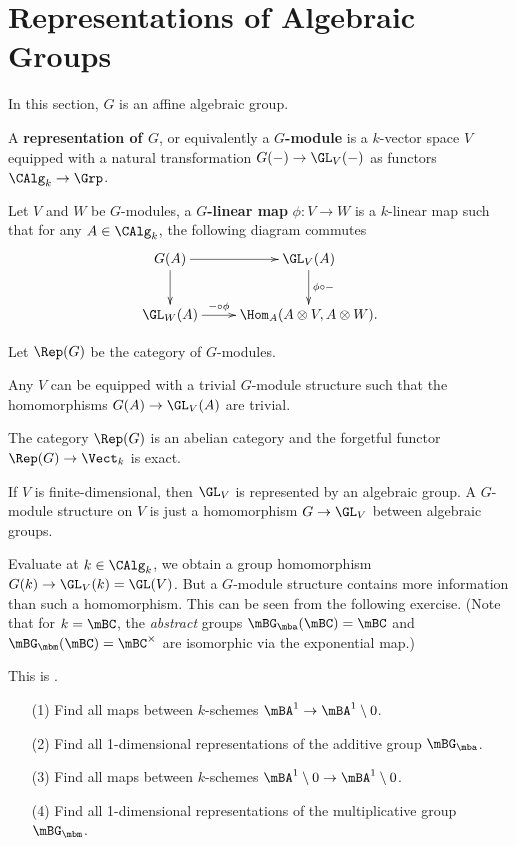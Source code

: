 \section{Representations of Algebraic Groups}

In this section, $G$ is an affine algebraic group.

\begin{defn}
	A \textbf{representation of $G$}, or equivalently a \textbf{$G$-module} is a $k$-vector space $V$ equipped with a natural transformation $G(-)\to \GL_V(-)$ as functors $\CAlg_k \to \Grp$.

	Let $V$ and $W$ be $G$-modules, a \textbf{$G$-linear map} $\phi:V\to W$ is a $k$-linear map such that for any $A\in \CAlg_k$, the following diagram commutes
	\[
		\xymatrix{
			G(A) \ar[r] \ar[d] &
			\GL_V(A) \ar[d]^-{\phi\circ-} \\
			\GL_W(A) \ar[r]^-{-\circ \phi} &
			\Hom_A( A\ot V,A\ot W ).
		}
	\]

	Let $\Rep(G)$ be the category of $G$-modules.
\end{defn}

\begin{exam}
	Any $V$ can be equipped with a trivial $G$-module structure such that the homomorphisms $G(A) \to \GL_V(A)$ are trivial.
\end{exam}

\begin{prop}
	The category $\Rep(G)$ is an abelian category and the forgetful functor $\Rep(G)\to \Vect_k$ is exact. 
\end{prop}

\begin{rem}
	If $V$ is finite-dimensional, then $\GL_V$ is represented by an algebraic group. A $G$-module structure on $V$ is just a homomorphism $G\to \GL_V$ between algebraic groups.
\end{rem}

\begin{warn}
	Evaluate at $k\in \CAlg_k$, we obtain a group homomorphism $G(k) \to \GL_V(k)=\GL(V)$. But a $G$-module structure contains more information than such a homomorphism. This can be seen from the following exercise. (Note that for $k=\mBC$, the \emph{abstract} groups $\mBG_\mba(\mBC)=\mBC$ and $\mBG_\mbm(\mBC)=\mBC^\times$ are isomorphic via the exponential map.)
\end{warn}


\begin{exe}
	This is .
	\begin{itemize}
		\item[(1)]
			Find all maps between $k$-schemes $\mBA^1\to \mBA^1\setminus 0$.
		\item[(2)]
			Find all 1-dimensional representations of the additive group $\mBG_\mba$.
		\item[(3)]
			Find all maps between $k$-schemes $\mBA^1\setminus 0\to \mBA^1\setminus 0$.
		\item[(4)]
			Find all 1-dimensional representations of the multiplicative group $\mBG_\mbm$.
	\end{itemize}

\end{exe}

